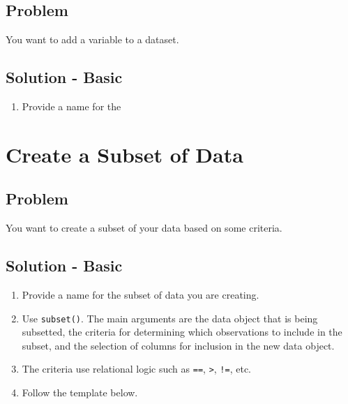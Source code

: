 \documentclass[
]{book}
\providecommand{\tightlist}{%
  \setlength{\itemsep}{0pt}\setlength{\parskip}{0pt}}
\begin{document}
\hypertarget{problem-20}{%
\subsection{Problem}\label{problem-20}}

You want to add a variable to a dataset.

\hypertarget{solution---basic}{%
\subsection{Solution - Basic}\label{solution---basic}}

\begin{enumerate}
\def\labelenumi{\arabic{enumi}.}
\tightlist
\item
  Provide a name for the
\end{enumerate}

\hypertarget{subset}{%
\section{Create a Subset of Data}\label{subset}}

\hypertarget{problem-21}{%
\subsection{Problem}\label{problem-21}}

You want to create a subset of your data based on some criteria.

\hypertarget{solution---basic-1}{%
\subsection{Solution - Basic}\label{solution---basic-1}}

\begin{enumerate}
\def\labelenumi{\arabic{enumi}.}
\tightlist
\item
  Provide a name for the subset of data you are creating.
\item
  Use \texttt{subset()}. The main arguments are the data object that is being subsetted, the criteria for determining which observations to include in the subset, and the selection of columns for inclusion in the new data object.
\item
  The criteria use relational logic such as \texttt{==}, \texttt{\textgreater{}}, \texttt{!=}, etc.
\item
  Follow the template below.
\end{enumerate}
\end{document}
